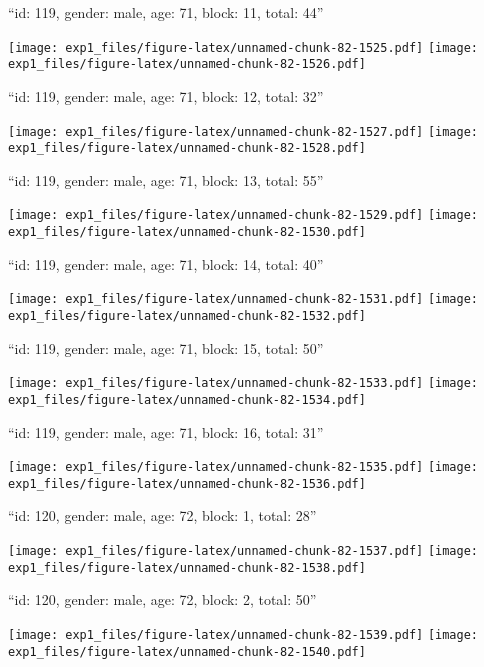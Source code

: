\documentclass[11pt,,]{article}
\begin{document}
\newpage
[1] 

``id: 119, gender: male, age: 71, block: 11, total: 44''

\texttt{[image: exp1\_files/figure-latex/unnamed-chunk-82-1525.pdf]}
\texttt{[image: exp1\_files/figure-latex/unnamed-chunk-82-1526.pdf]}

\newpage
[1] 

``id: 119, gender: male, age: 71, block: 12, total: 32''

\texttt{[image: exp1\_files/figure-latex/unnamed-chunk-82-1527.pdf]}
\texttt{[image: exp1\_files/figure-latex/unnamed-chunk-82-1528.pdf]}

\newpage
[1] 

``id: 119, gender: male, age: 71, block: 13, total: 55''

\texttt{[image: exp1\_files/figure-latex/unnamed-chunk-82-1529.pdf]}
\texttt{[image: exp1\_files/figure-latex/unnamed-chunk-82-1530.pdf]}

\newpage
[1] 

``id: 119, gender: male, age: 71, block: 14, total: 40''

\texttt{[image: exp1\_files/figure-latex/unnamed-chunk-82-1531.pdf]}
\texttt{[image: exp1\_files/figure-latex/unnamed-chunk-82-1532.pdf]}

\newpage
[1] 

``id: 119, gender: male, age: 71, block: 15, total: 50''

\texttt{[image: exp1\_files/figure-latex/unnamed-chunk-82-1533.pdf]}
\texttt{[image: exp1\_files/figure-latex/unnamed-chunk-82-1534.pdf]}

\newpage
[1] 

``id: 119, gender: male, age: 71, block: 16, total: 31''

\texttt{[image: exp1\_files/figure-latex/unnamed-chunk-82-1535.pdf]}
\texttt{[image: exp1\_files/figure-latex/unnamed-chunk-82-1536.pdf]}

\newpage
[1] 

``id: 120, gender: male, age: 72, block: 1, total: 28''

\texttt{[image: exp1\_files/figure-latex/unnamed-chunk-82-1537.pdf]}
\texttt{[image: exp1\_files/figure-latex/unnamed-chunk-82-1538.pdf]}

\newpage
[1] 

``id: 120, gender: male, age: 72, block: 2, total: 50''

\texttt{[image: exp1\_files/figure-latex/unnamed-chunk-82-1539.pdf]}
\texttt{[image: exp1\_files/figure-latex/unnamed-chunk-82-1540.pdf]}
\end{document}
